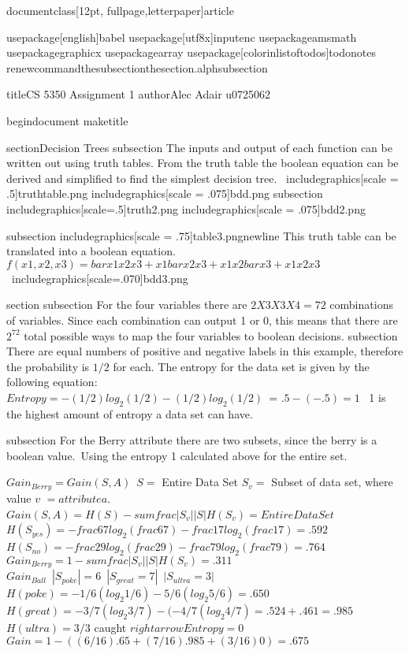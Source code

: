 documentclass[12pt, fullpage,letterpaper]{article}


usepackage[english]{babel}
usepackage[utf8x]{inputenc}
usepackage{amsmath}
usepackage{graphicx}
usepackage{array}
usepackage[colorinlistoftodos]{todonotes}
renewcommand{thesubsection}{thesection.alph{subsection}}

title{CS 5350 Assignment 1}
author{Alec Adair u0725062}

begin{document}
maketitle

section{Decision Trees}
subsection{}
The inputs and output of each function can be written out using truth tables.
From the truth table the boolean equation can be derived and simplified to find the simplest decision tree.\
includegraphics[scale = .5]{truthtable.png}
includegraphics[scale = .075]{bdd.png}
subsection{}
includegraphics[scale=.5]{truth2.png}
includegraphics[scale = .075]{bdd2.png}\ 

subsection{}
includegraphics[scale = .75]{table3.png}newline
This truth table can be translated into a boolean equation.\\
$f(x1,x2,x3) = bar{x1}x2x3 +x1bar{x2}x3 + x1x2bar{x3} + x1x2x3$ \
includegraphics[scale=.070]{bdd3.png}

section{}
subsection{}
For the four variables there are $2 X 3 X 3 X 4 = 72$ combinations of variables. Since each combination can output 1 or 0, this means that there are $2^{72}$ total possible ways to map the four variables to boolean decisions.
subsection{}
There are equal numbers of positive and negative labels in this example, therefore the probability is $1/2$ for each.
The entropy for the data set is given by the following equation:\\
$Entropy = -  (1/2) log_2(1/2) - (1/2)log_2(1/2)$\
= $ .5 - (-.5) = 1$ \
1 is the highest amount of entropy a data set can have.

subsection{}
For the Berry attribute there are two subsets, since the berry is a boolean value.\
Using the entropy 1 calculated above for the entire set.\

$Gain_{Berry} = Gain(S,A)$\
$S =$ Entire Data Set $S_v =$ Subset of data set, where value $v$ $= attribute a$.\
$Gain(S,A) = H(S) - sum  frac{|S_v|}{|S|}H(S_v) = Entire Data Set$\
$H(S_{yes}) = -frac{6}{7}log_2(frac{6}{7})-frac{1}{7}log_2(frac{1}{7}) = .592$\
$H(S_{no}) = -frac{2}{9}log_2(frac{2}{9})-frac{7}{9}log_2(frac{7}{9}) = .764$\
$ Gain_{Berry} = 1- sumfrac{|S_v|}{|S|}H(S_v) = .311$\\
$Gain_{Ball}$\
$|S_{poke}| = 6$\
$|S_{great} = 7|$\
$|S_{ultra} = 3|$\
$H(poke) = -1/6(log_2{1/6}) - 5/6(log_2{5/6}) = .650$\
$H(great)= -3/7(log_2{3/7}) -(- 4/7(log_2{4/7}) = .524 + .461 = .985$\
$H(ultra) = 3/3$ caught $rightarrow Entropy = 0$\
$Gain = 1 -  ((6/16).65 + (7/16).985 + (3/16)0) = .675$\\

